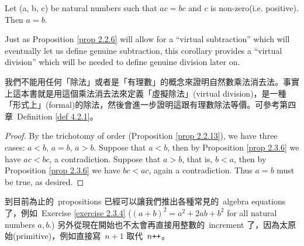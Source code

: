 \begin{corollary} \label{corollary 2.3.7}
Let (a, b, c) be natural numbers such that \(ac = bc\) and \(c\) is non-zero(i.e. positive). Then \(a = b\).
\end{corollary}

\begin{remark} \label{remark 2.3.8}
Just as Proposition \ref{prop 2.2.6} will allow for a “virtual subtraction” which will eventually let us define genuine subtraction, this corollary provides a “virtual division” which will be needed to define genuine division later on.
\end{remark}
\begin{note}
我們不能用任何「除法」或者是「有理數」的概念來證明自然數乘法消去法。事實上這本書就是用這個乘法消去法來定義「虛擬除法」(virtual division)，是一種「形式上」(formal)的除法，然後會進一步證明這跟有理數除法等價。可參考第四章\ Definition \ref{def 4.2.1}。
\end{note}
\begin{proof}
By the trichotomy of order (Proposition \ref{prop 2.2.13}), we have three cases: \(a < b\), \(a = b\), \(a > b\). Suppose that \(a < b\), then by Proposition \ref{prop 2.3.6} we have \(ac < bc\), a contradiction. Suppose that \(a > b\), that is, \(b < a\), then by Proposition \ref{prop 2.3.6} we have \(bc < ac\), again a contradiction. Thus \(a = b\) must be true, as desired.
\end{proof}

\begin{note}
到目前為止的\ propositions 已經可以讓我們推出各種常見的\ algebra equations 了，例如\ Exercise \ref{exercise 2.3.4} (\((a + b)^2 = a^2 +2ab + b^2\) for all natural numbers \(a, b\).) 另外從現在開始也不太會再直接用整數的\ increment 了，因為太原始(primitive)，例如直接寫\ \(n + 1\) 取代\ \(n\texttt{++}\)。
\end{note}